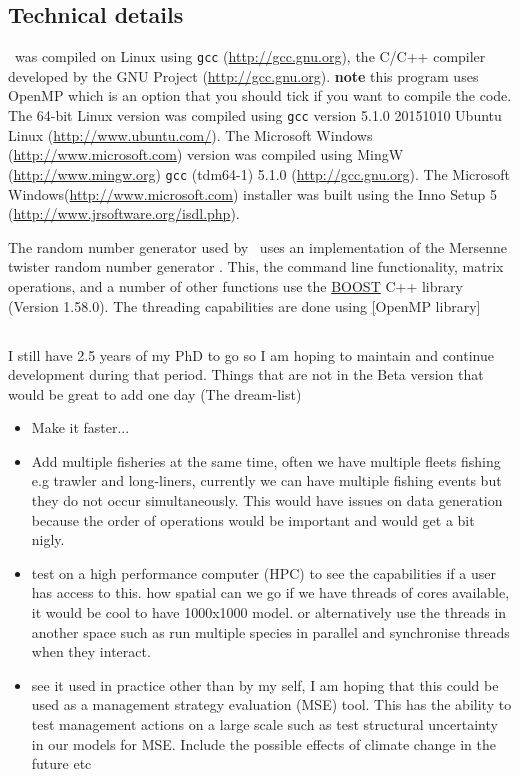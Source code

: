 \subsection{Technical details}\label{sec:tech}

\IBM\ was compiled on Linux using \texttt{gcc} (\url{http://gcc.gnu.org}), the C/C++ compiler developed by the GNU Project (\url{http://gcc.gnu.org}). \textbf{note} this program uses OpenMP which is an option that you should tick if you want to compile the code. The 64-bit Linux  version was compiled using \texttt{gcc} version 5.1.0 20151010 Ubuntu Linux (\url{http://www.ubuntu.com/}). The Microsoft Windows (\url{http://www.microsoft.com}) version was compiled using MingW (\url{http://www.mingw.org}) \texttt{gcc} (tdm64-1) 5.1.0 (\url{http://gcc.gnu.org}). The Microsoft Windows(\url{http://www.microsoft.com}) installer was built using the Inno Setup 5 (\url{http://www.jrsoftware.org/isdl.php}).

The random number generator used by \IBM\ uses an implementation of the Mersenne twister random number generator \citep{796}. This, the command line functionality, matrix operations, and a number of other functions use the \href{http://www.boost.org/}{BOOST} C++ library (Version 1.58.0). The threading capabilities are done using \href{https://www.openmp.org/}[OpenMP library]


\subsection{}
I still have 2.5 years of my PhD to go so I am hoping to maintain and continue development during that period. Things that are not in the Beta version that would be great to add one day (The dream-list)

\begin{itemize}
	\item Make it faster...
	\item Add multiple fisheries at the same time, often we have multiple fleets fishing e.g trawler and long-liners, currently we can have multiple fishing events but they do not occur simultaneously. This would have issues on data generation because the order of operations would be important and would get a bit nigly.
	\item test on a high performance computer (HPC) to see the capabilities if a user has access to this. how spatial can we go if we have threads of cores available, it would be cool to have 1000x1000 model. or alternatively use the threads in another space such as run multiple species in parallel and synchronise threads when they interact.	
	\item see it used in practice other than by my self, I am hoping that this could be used as a management strategy evaluation (MSE) tool. This has the ability to test management actions on a large scale such as test structural uncertainty in our models for MSE. Include the possible effects of climate change in the future etc
\end{itemize}




